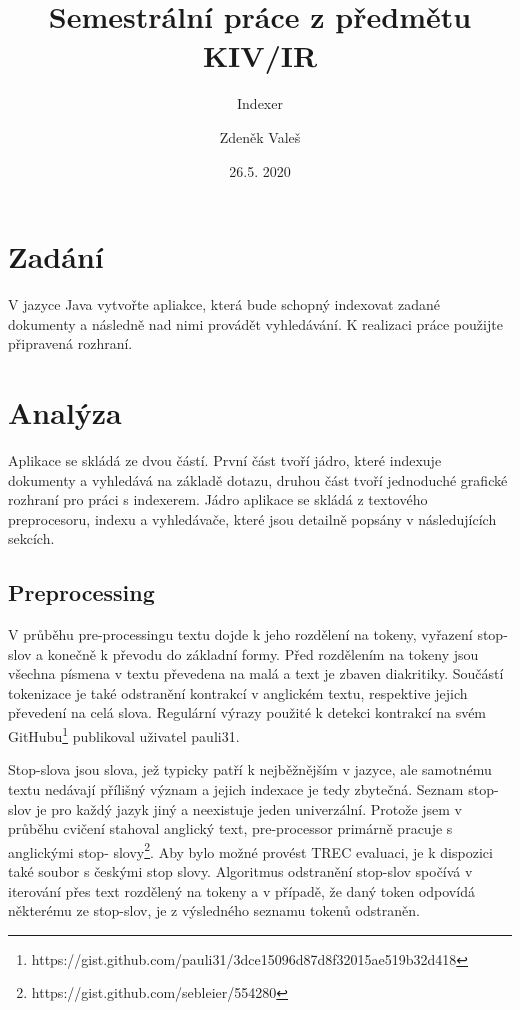 \documentclass[11pt,a4paper]{scrartcl}
\begin{document}
	\title{Semestrální práce z předmětu KIV/IR}
	\subtitle{Indexer}
	\author{Zdeněk Valeš}
	\date{26.5. 2020}
	\maketitle
	\newpage
	
	\section{Zadání}
	V jazyce Java vytvořte apliakce, která bude schopný indexovat zadané dokumenty a následně nad nimi provádět vyhledávání. K realizaci práce použijte připravená rozhraní.
	
	\section{Analýza}
	Aplikace se skládá ze dvou částí. První část tvoří jádro, které indexuje dokumenty a vyhledává na základě dotazu, druhou část tvoří jednoduché grafické rozhraní pro práci s indexerem. Jádro aplikace se skládá z textového preprocesoru, indexu a vyhledávače, které jsou detailně popsány v následujících sekcích.
	
	\subsection{Preprocessing}
	
	V průběhu pre-processingu textu dojde k jeho rozdělení na tokeny, vyřazení stop-slov a konečně k převodu do základní formy. Před rozdělením na tokeny jsou všechna písmena v textu převedena na malá a text je zbaven diakritiky. Součástí tokenizace je také odstranění kontrakcí v anglickém textu, respektive jejich převedení na celá slova. Regulární výrazy použité k detekci kontrakcí na svém GitHubu\footnote{https://gist.github.com/pauli31/3dce15096d87d8f32015ae519b32d418} publikoval uživatel pauli31. 
	
	Stop-slova jsou slova, jež typicky patří k nejběžnějším v jazyce, ale samotnému textu nedávají přílišný význam a jejich indexace je tedy zbytečná. Seznam stop-slov je pro každý jazyk jiný a neexistuje jeden univerzální. Protože jsem v průběhu cvičení stahoval anglický text, pre-processor primárně pracuje s anglickými stop- slovy\footnote{https://gist.github.com/sebleier/554280}. Aby bylo možné provést TREC evaluaci, je k dispozici také soubor s českými stop slovy. Algoritmus odstranění stop-slov spočívá v iterování přes text rozdělený na tokeny a v případě, že daný token odpovídá některému ze stop-slov, je z výsledného seznamu tokenů odstraněn.
	
\end{document}
